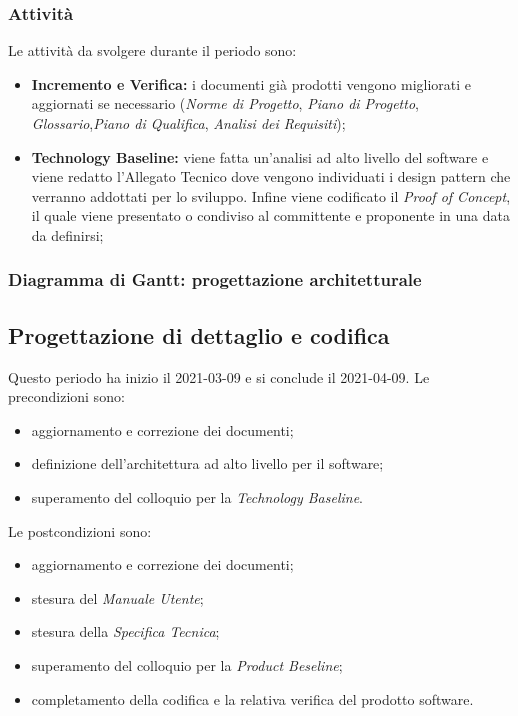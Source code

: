 \subsubsection{Attività}
Le attività da svolgere durante il periodo sono:
\begin{itemize}
	\item \textbf{Incremento e Verifica:} i documenti già prodotti vengono migliorati e aggiornati se necessario (\textit{Norme di Progetto}, \textit{Piano di Progetto}, \textit{Glossario},\textit{Piano di Qualifica}, \textit{Analisi dei Requisiti});
	\item \textbf{Technology Baseline:} viene fatta un'analisi ad alto livello del software e viene redatto l'Allegato Tecnico dove vengono individuati i design pattern che verranno addottati per lo sviluppo. Infine viene codificato il \textit{Proof of Concept}, il quale viene presentato o condiviso al committente e proponente in una data da definirsi;
\end{itemize}
\subsubsection{Diagramma di Gantt: progettazione architetturale}

\newpage
\subsection{Progettazione di dettaglio e codifica}
Questo periodo ha inizio il 2021-03-09 e si conclude il 2021-04-09.
Le precondizioni sono:
\begin{itemize}
	\item aggiornamento e correzione dei documenti;
	\item definizione dell'architettura ad alto livello per il software;
	\item  superamento del colloquio per la \textit{Technology Baseline}.
\end{itemize}
Le postcondizioni sono:
\begin{itemize}
	\item aggiornamento e correzione dei documenti;
	\item stesura del \textit{Manuale Utente};
	\item stesura della \textit{Specifica Tecnica};
	\item superamento del colloquio per la \textit{Product Beseline};
	\item completamento della codifica e la relativa verifica del prodotto software.
\end{itemize}
